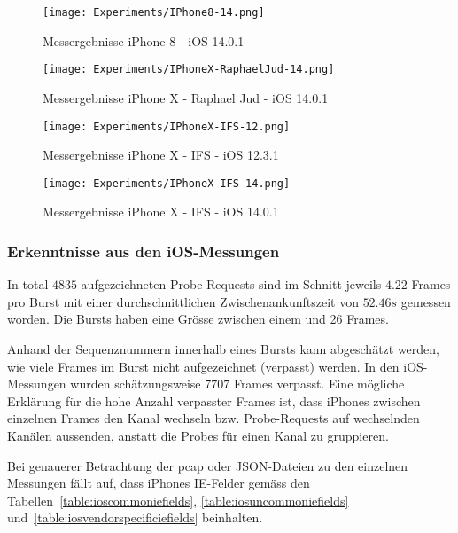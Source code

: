\begin{figure}[h!]
    \centering
    \texttt{[image: Experiments/IPhone8-14.png]}
    \caption{Messergebnisse iPhone 8 - iOS 14.0.1}
    \label{figure:iosmeasurementsbycategoryiphone-8-14}
\end{figure}

\begin{figure}[h!]
    \centering
    \texttt{[image: Experiments/IPhoneX-RaphaelJud-14.png]}
    \caption{Messergebnisse iPhone X - Raphael Jud - iOS 14.0.1}
    \label{figure:iosmeasurementsbycategoryiphone-se-14}
\end{figure}

\begin{figure}[h!]
    \centering
    \texttt{[image: Experiments/IPhoneX-IFS-12.png]}
    \caption{Messergebnisse iPhone X - IFS - iOS 12.3.1}
    \label{figure:iosmeasurementsbycategoryiphone-x-12}
\end{figure}

\begin{figure}[h!]
    \centering
    \texttt{[image: Experiments/IPhoneX-IFS-14.png]}
    \caption{Messergebnisse iPhone X - IFS - iOS 14.0.1}
    \label{figure:iosmeasurementsbycategoryiphone-x-14}
\end{figure}

\clearpage

\subsubsection*{Erkenntnisse aus den iOS-Messungen}
In total $4835$ aufgezeichneten Probe-Requests sind im Schnitt jeweils $4.22$ 
Frames pro Burst mit einer durchschnittlichen Zwischenankunftszeit von $52.46 s$
gemessen worden. Die Bursts haben eine Grösse zwischen einem und 26 Frames.

Anhand der Sequenznummern innerhalb eines Bursts kann abgeschätzt werden, wie 
viele Frames im Burst nicht aufgezeichnet (verpasst) werden.
In den iOS-Messungen wurden schätzungsweise $7707$ Frames verpasst.
Eine mögliche Erklärung für die hohe Anzahl verpasster Frames ist, dass
iPhones zwischen einzelnen Frames den Kanal wechseln bzw. Probe-Requests auf 
wechselnden Kanälen aussenden, anstatt die Probes für einen Kanal zu gruppieren.

Bei genauerer Betrachtung der pcap oder JSON-Dateien zu den einzelnen Messungen
fällt auf, dass iPhones IE-Felder gemäss den Tabellen~\ref{table:ioscommoniefields}, 
\ref{table:iosuncommoniefields} und~\ref{table:iosvendorspecificiefields} 
beinhalten.


